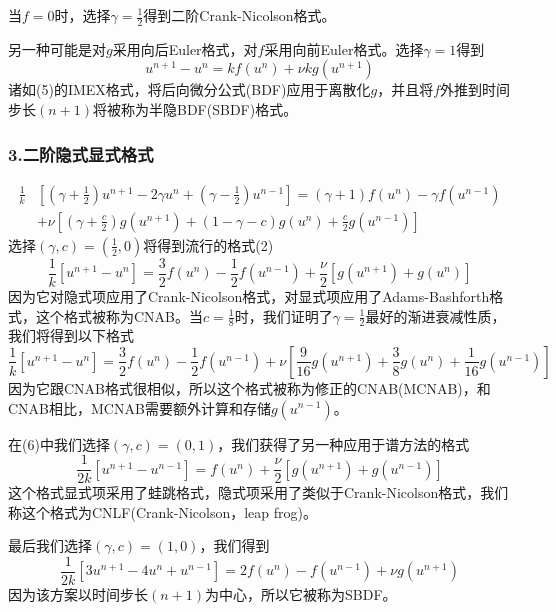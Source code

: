 \documentclass[12pt,a4paper]{article}
\begin{document}
当$f=0$时，选择$\gamma=\frac{1}{2}$得到二阶Crank-Nicolson格式。

另一种可能是对$g$采用向后Euler格式，对$f$采用向前Euler格式。选择$\gamma=1$得到
\begin{equation}
u^{n+1}-u^n=kf(u^n)+\nu kg(u^{n+1})
\end{equation}
诸如(5)的IMEX格式，将后向微分公式(BDF)应用于离散化$g$，并且将$f$外推到时间步长$(n+1)$将被称为半隐BDF(SBDF)格式。
\subsubsection{3.二阶隐式显式格式}
\begin{equation}
\begin{aligned}
\frac{1}{k}&\left[\left(\gamma+\frac{1}{2}\right)u^{n+1}-2\gamma u^n+\left(\gamma-\frac{1}{2}\right)u^{n-1}\right]=(\gamma+1)f(u^n)-\gamma f(u^{n-1})\\
&+\nu\left[\left(\gamma+\frac{c}{2}\right)g(u^{n+1})+(1-\gamma-c)g(u^n)+\frac{c}{2}g(u^{n-1})\right]
\end{aligned}
\end{equation}
选择$(\gamma,c)=(\frac{1}{2},0)$将得到流行的格式(2)
\begin{equation}
\frac{1}{k}[u^{n+1}-u^n]=\frac{3}{2}f(u^n)-\frac{1}{2}f(u^{n-1})+\frac{\nu}{2}[g(u^{n+1})+g(u^n)]
\end{equation}
因为它对隐式项应用了Crank-Nicolson格式，对显式项应用了Adams-Bashforth格式，这个格式被称为CNAB。当$c=\frac{1}{8}$时，我们证明了$\gamma=\frac{1}{2}$最好的渐进衰减性质，我们将得到以下格式
\begin{equation}
\frac{1}{k}[u^{n+1}-u^n]=\frac{3}{2}f(u^n)-\frac{1}{2}f(u^{n-1})+\nu\left[\frac{9}{16}g(u^{n+1})+\frac{3}{8}g(u^n)+\frac{1}{16}g(u^{n-1})\right]
\end{equation}
因为它跟CNAB格式很相似，所以这个格式被称为修正的CNAB(MCNAB)，和CNAB相比，MCNAB需要额外计算和存储$g(u^{n-1})$。

在(6)中我们选择$(\gamma,c)=(0,1)$，我们获得了另一种应用于谱方法的格式
\begin{equation}
\frac{1}{2k}[u^{n+1}-u^{n-1}]=f(u^n)+\frac{\nu}{2}[g(u^{n+1})+g(u^{n-1})]
\end{equation}
这个格式显式项采用了蛙跳格式，隐式项采用了类似于Crank-Nicolson格式，我们称这个格式为CNLF(Crank-Nicolson，leap frog)。

最后我们选择$(\gamma,c)=(1,0)$，我们得到
\begin{equation}
\frac{1}{2k}[3u^{n+1}-4u^n+u^{n-1}]=2f(u^n)-f(u^{n-1})+\nu g(u^{n+1})
\end{equation}
因为该方案以时间步长$(n+1)$为中心，所以它被称为SBDF。
\end{document}

